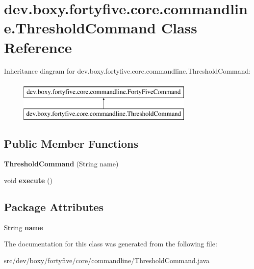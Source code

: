 \hypertarget{classdev_1_1boxy_1_1fortyfive_1_1core_1_1commandline_1_1_threshold_command}{
\section{dev.boxy.fortyfive.core.commandline.ThresholdCommand Class Reference}
\label{d3/d7b/classdev_1_1boxy_1_1fortyfive_1_1core_1_1commandline_1_1_threshold_command}
}
Inheritance diagram for dev.boxy.fortyfive.core.commandline.ThresholdCommand:\begin{figure}[H]
\begin{center}
\leavevmode
\includegraphics[height=2.000000cm]{d3/d7b/classdev_1_1boxy_1_1fortyfive_1_1core_1_1commandline_1_1_threshold_command}
\end{center}
\end{figure}
\subsection*{Public Member Functions}
\begin{DoxyCompactItemize}
\item 
\hypertarget{classdev_1_1boxy_1_1fortyfive_1_1core_1_1commandline_1_1_threshold_command_affc63897a91c8c1300a9230b6c12b7e9}{
{\bfseries ThresholdCommand} (String name)}
\label{d3/d7b/classdev_1_1boxy_1_1fortyfive_1_1core_1_1commandline_1_1_threshold_command_affc63897a91c8c1300a9230b6c12b7e9}

\item 
\hypertarget{classdev_1_1boxy_1_1fortyfive_1_1core_1_1commandline_1_1_threshold_command_a6f1fdf8cd52d801a2e6ed88360bc2993}{
void {\bfseries execute} ()}
\label{d3/d7b/classdev_1_1boxy_1_1fortyfive_1_1core_1_1commandline_1_1_threshold_command_a6f1fdf8cd52d801a2e6ed88360bc2993}

\end{DoxyCompactItemize}
\subsection*{Package Attributes}
\begin{DoxyCompactItemize}
\item 
\hypertarget{classdev_1_1boxy_1_1fortyfive_1_1core_1_1commandline_1_1_threshold_command_a69a4fe3b9b746a4d7112185f24dce550}{
String {\bfseries name}}
\label{d3/d7b/classdev_1_1boxy_1_1fortyfive_1_1core_1_1commandline_1_1_threshold_command_a69a4fe3b9b746a4d7112185f24dce550}

\end{DoxyCompactItemize}


The documentation for this class was generated from the following file:\begin{DoxyCompactItemize}
\item 
src/dev/boxy/fortyfive/core/commandline/ThresholdCommand.java\end{DoxyCompactItemize}
